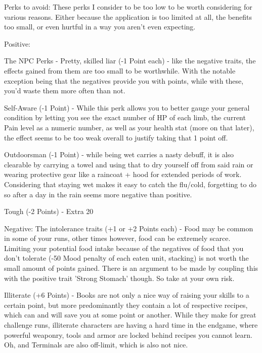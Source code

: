 \documentclass[11pt]{report}
\begin{document}
Perks to avoid:
These perks I consider to be too low to be worth considering for various reasons. Either because the application is too limited at all, the benefits too small, or even hurtful in a way you aren't even expecting.

Positive:

The NPC Perks - Pretty, skilled liar (-1 Point each) - like the negative traits, the effects gained from them are too small to be worthwhile. With the notable exception being that the negatives provide you with points, while with these, you'd waste them more often than not.

Self-Aware (-1 Point) - While this perk allows you to better gauge your general condition by letting you see the exact number of HP of each limb, the current Pain level as a numeric number, as well as your health stat (more on that later), the effect seems to be too weak overall to justify taking that 1 point off.

Outdoorsman (-1 Point) - while being wet carries a nasty debuff, it is also clearable by carrying a towel and using that to dry yourself off from said rain or wearing protective gear like a raincoat + hood for extended periods of work. Considering that staying wet makes it easy to catch the flu/cold, forgetting to do so after a day in the rain seems more negative than positive.

Tough (-2 Points) - Extra 20%

Negative:
The intolerance traits (+1 or +2 Points each) - Food may be common in some of your runs, other times however, food can be extremely scarce. Limiting your potential food intake because of the negatives of food that you don't tolerate (-50 Mood penalty of each eaten unit, stacking) is not worth the small amount of points gained. There is an argument to be made by coupling this with the positive trait 'Strong Stomach' though. So take at your own risk.

Illiterate (+6 Points) - Books are not only a nice way of raising your skills to a certain point, but more predominantly they contain a lot of respective recipes, which can and will save you at some point or another. While they make for great challenge runs, illiterate characters are having a hard time in the endgame, where powerful weaponry, tools and armor are locked behind recipes you cannot learn. Oh, and Terminals are also off-limit, which is also not nice.
\end{document}
